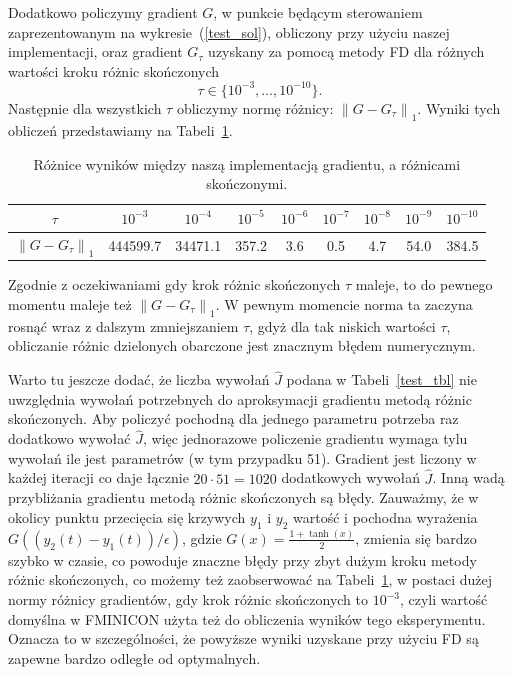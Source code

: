 \documentclass[licencjacka]{pracamgr}
\newcommand{\norm}[1]{\left\lVert#1\right\rVert}
\begin{document}
Dodatkowo policzymy gradient $G$, w punkcie będącym sterowaniem zaprezentowanym na wykresie~(\ref{test_sol}), obliczony przy użyciu naszej implementacji, oraz gradient $G_\tau$ uzyskany za pomocą metody FD dla różnych wartości kroku różnic skończonych
\[\tau \in \{10^{-3},\ldots,10^{-10}\}.\]
Następnie dla wszystkich $\tau$ obliczymy normę różnicy: $\norm{G - G_\tau}_1$. Wyniki tych obliczeń przedstawiamy na Tabeli~\ref{grad_fd_tbl}.

\begin{table}[h!]
  \begin{center}
    \begin{tabular}{|c|c|c|c|c|c|c|c|c|}
      \hline
      $\tau$ & $10^{-3}$ & $10^{-4}$ & $10^{-5}$ & $10^{-6}$ & $10^{-7}$ & $10^{-8}$ & $10^{-9}$ & $10^{-10}$ \\
      \hline
      $\norm{G - G_\tau}_1$ & 444599.7 & 34471.1 & 357.2 & 3.6 & 0.5 & 4.7 & 54.0 & 384.5 \\
      \hline
    \end{tabular}
    \caption{Różnice wyników między naszą implementacją gradientu, a różnicami skończonymi.}\label{grad_fd_tbl}
  \end{center}
\end{table}

Zgodnie z oczekiwaniami gdy krok różnic skończonych $\tau$ maleje, to do pewnego momentu maleje też $\norm{G - G_\tau}_1$. W pewnym momencie norma ta zaczyna rosnąć wraz z dalszym zmniejszaniem $\tau$, gdyż dla tak niskich wartości $\tau$, obliczanie różnic dzielonych obarczone jest znacznym błędem numerycznym.

Warto tu jeszcze dodać, że liczba wywołań $\hat{J}$ podana w Tabeli~\ref{test_tbl} nie uwzględnia wywołań potrzebnych do aproksymacji gradientu metodą różnic skończonych. Aby policzyć pochodną dla jednego parametru potrzeba raz dodatkowo wywołać $\hat{J}$, więc jednorazowe policzenie gradientu wymaga tylu wywołań ile jest parametrów (w tym przypadku 51). Gradient jest liczony w każdej iteracji co daje łącznie $20\cdot 51 = 1020$ dodatkowych wywołań $\hat{J}$. Inną wadą przybliżania gradientu metodą różnic skończonych są błędy. Zauważmy, że w okolicy punktu przecięcia się krzywych $y_1$ i $y_2$ wartość i pochodna wyrażenia $G((y_2(t) - y_1(t))/\epsilon)$, gdzie $G(x) = \frac{1 + \tanh(x)}{2}$, zmienia się bardzo szybko w czasie, co powoduje znaczne błędy przy zbyt dużym kroku metody różnic skończonych, co możemy też zaobserwować na Tabeli~\ref{grad_fd_tbl}, w postaci dużej normy różnicy gradientów, gdy krok różnic skończonych to $10^{-3}$, czyli wartość domyślna w FMINICON użyta też do obliczenia wyników tego eksperymentu. Oznacza to w szczególności, że powyższe wyniki uzyskane przy użyciu FD są zapewne bardzo odległe od optymalnych.
\end{document}
